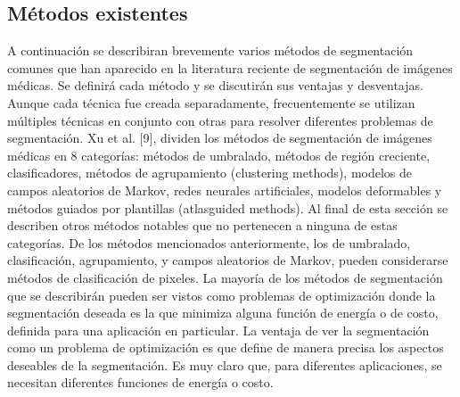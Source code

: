 \subsection{M\'etodos existentes}
A continuaci\'on se describiran brevemente varios m\'etodos de segmentaci\'on comunes que han aparecido en la literatura reciente de segmentaci\'on de im\'agenes m\'edicas.
Se definir\'a cada m\'etodo y se discutir\'an sus ventajas y desventajas. Aunque cada t\'ecnica fue
creada separadamente, frecuentemente se utilizan m\'ultiples t\'ecnicas en conjunto con otras
para resolver diferentes problemas de segmentaci\'on.
Xu et al. [9], dividen los m\'etodos de segmentaci\'on de im\'agenes m\'edicas en 8
categor\'ias: m\'etodos de umbralado, m\'etodos de regi\'on creciente, clasificadores, m\'etodos
de agrupamiento (clustering methods), modelos de campos aleatorios de Markov, redes
neurales artificiales, modelos deformables y m\'etodos guiados por plantillas (atlasguided
methods). Al final de esta secci\'on se describen otros m\'etodos notables que no pertenecen a
ninguna de estas categor\'ias. De los m\'etodos mencionados anteriormente, los de
umbralado, clasificaci\'on, agrupamiento, y campos aleatorios de Markov, pueden
considerarse m\'etodos de clasificaci\'on de pixeles.
La mayor\'ia de los m\'etodos de segmentaci\'on que se describir\'an pueden ser vistos
como problemas de optimizaci\'on donde la segmentaci\'on deseada es la que minimiza alguna
funci\'on de energ\'ia o de costo, definida para una aplicaci\'on en particular. La ventaja de ver
la segmentaci\'on como un problema de optimizaci\'on es que define de manera precisa los
aspectos deseables de la segmentaci\'on. Es muy claro que, para diferentes aplicaciones, se
necesitan diferentes funciones de energ\'ia o costo.

